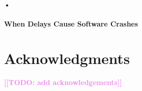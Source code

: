 \documentclass[conference]{IEEEtran}
\newcommand{\todo}[1]{\textcolor{violet}{{\bfseries [[TODO: #1]]}}}
\begin{document}
\paragraph{•}

\paragraph{When Delays Cause Software Crashes}
\label{sec:timing-methodology-RQ-crash}

\section*{Acknowledgments}

\todo{add acknowledgements}




\end{document}
